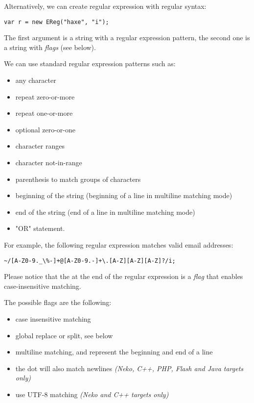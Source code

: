 Alternatively, we can create regular expression with regular syntax:

\begin{lstlisting}
var r = new EReg("haxe", "i");
\end{lstlisting}

The first argument is a string with a regular expression pattern, the second one is a string with \emph{flags} (see below).

We can use standard regular expression patterns such as:
\begin{itemize}
	\item {} any character
	\item \expr{*} repeat zero-or-more
	\item \expr{+} repeat one-or-more
	\item {} optional zero-or-one
	\item \expr{[A-Z0-9]} character ranges
	\item {} character not-in-range
	\item {} parenthesis to match groups of characters
	\item \expr{\textasciicircum} beginning of the string (beginning of a line in multiline matching mode)
	\item \expr{\$} end of the string (end of a line in multiline matching mode)
	\item \expr{|} "OR" statement.
\end{itemize}

For example, the following regular expression matches valid email addresses:
\begin{lstlisting}
~/[A-Z0-9._\%-]+@[A-Z0-9.-]+\.[A-Z][A-Z][A-Z]?/i;
\end{lstlisting}

Please notice that the  at the end of the regular expression is a \emph{flag} that enables case-insensitive matching.

The possible flags are the following:
\begin{itemize}
	\item {} case insensitive matching
	\item {} global replace or split, see below
	\item {} multiline matching, \expr{\textasciicircum} and \expr{\$} represent the beginning and end of a line
	\item {} the dot  will also match newlines \emph{(Neko, C++, PHP, Flash and Java targets only)}
	\item {} use UTF-8 matching \emph{(Neko and C++ targets only)}
\end{itemize}

